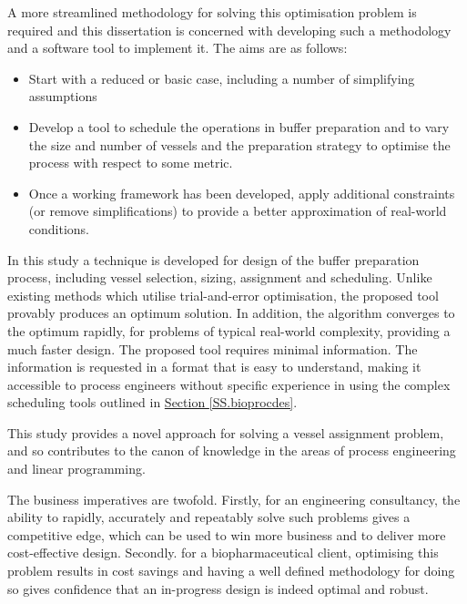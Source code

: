 A more streamlined methodology for solving this optimisation problem is
required and this dissertation is concerned with developing such a methodology
and a software tool to implement it.
The aims are as follows:
\begin{itemize}
    \item Start with a reduced or basic case, including a number of simplifying
        assumptions
    \item Develop a tool to schedule the operations in buffer preparation and
        to vary the size and number of vessels and the preparation strategy to
        optimise the process with respect to some metric.
    \item Once a working framework has been developed, apply additional
        constraints (or remove simplifications) to provide a better
        approximation of real-world conditions.
\end{itemize}

In this study a technique is developed for design of the buffer preparation
process, including vessel selection, sizing, assignment and scheduling.
Unlike existing methods which utilise trial-and-error optimisation, the
proposed tool provably produces an optimum solution.
In addition, the algorithm converges to the optimum rapidly, for problems of
typical real-world complexity, providing a much faster design.
The proposed tool requires minimal information.
The information is requested in a format that is easy to understand, making it
accessible to process engineers without specific experience in using the
complex scheduling tools outlined in
\hyperref[SS.bioprocdes]{Section \ref*{SS.bioprocdes}}.

This study provides a novel approach for solving a vessel assignment problem,
and so contributes to the canon of knowledge in the areas of process
engineering and linear programming.

The business imperatives are twofold.
Firstly, for an engineering consultancy, the ability to rapidly, accurately and
repeatably solve such problems gives a competitive edge, which can be used to
win more business and to deliver more cost-effective design.
Secondly. for a biopharmaceutical client, optimising this problem results in
cost savings and having a well defined methodology for doing so gives
confidence that an in-progress design is indeed optimal and robust.


